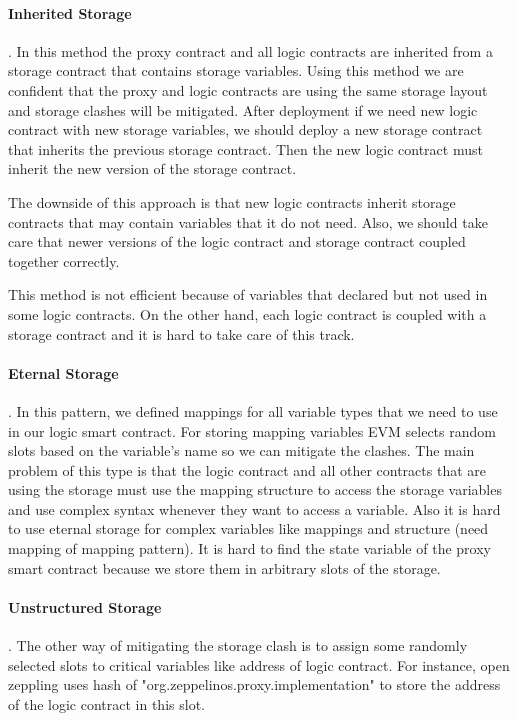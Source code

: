 \paragraph{Inherited Storage}. 
In this method the proxy contract and all logic contracts are inherited from a storage contract that contains storage variables. Using this method we are confident that the proxy and logic contracts are using the same storage layout and storage clashes will be mitigated.
After deployment if we need new logic contract with new storage variables, we should deploy a new storage contract that inherits the previous storage contract. Then the new logic contract must inherit the new version of the storage contract.

The downside of this approach is that new logic contracts inherit storage contracts that may contain variables that it do not need. Also, we should take care that newer versions of the logic contract and storage contract coupled together correctly.

This method is not efficient because of variables that declared but not used in some logic contracts. On the other hand, each logic contract is coupled with a storage contract and it is hard to take care of this track. 
\paragraph{Eternal Storage}. 
In this pattern, we defined mappings for all variable types that we need to use in our logic smart contract. For storing mapping variables EVM selects random slots based on the variable's name so we can mitigate the clashes.
The main problem of this type is that the logic contract and all other contracts that are using the storage must use the mapping structure to access the storage variables and use complex syntax whenever they want to access a variable.
Also it is hard to use eternal storage for complex variables like mappings and structure (need mapping of mapping pattern).
It is hard to find the state variable of the proxy smart contract because we store them in arbitrary slots of the storage.
\paragraph{Unstructured Storage}. 
The other way of mitigating the storage clash is to assign some randomly selected slots to critical variables like address of logic contract. For instance, open zeppling uses hash of "org.zeppelinos.proxy.implementation" to store the address of the logic contract in this slot.

